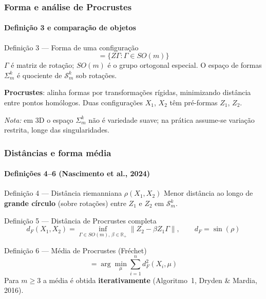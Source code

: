 \documentclass[brazilian,11pt]{beamer}
\begin{document}
\begin{frame}[shrink=8]
    \frametitle{Forma e análise de Procrustes}
    \framesubtitle{Definição 3 e comparação de objetos}

    \begin{block}{Definição 3 --- Forma de uma configuração}
        \begin{equation}
            [Z] = \{ Z\Gamma : \Gamma \in SO(m) \}
        \end{equation}
        $\Gamma$ é matriz de rotação; $SO(m)$ é o grupo ortogonal especial. O espaço de formas $\Sigma_m^k$ é quociente de $\mathcal{S}_m^k$ sob rotações.
    \end{block}

    \textbf{Procrustes}: alinha formas por transformações rígidas, minimizando distância entre pontos homólogos. Duas configurações $X_1$, $X_2$ têm pré-formas $Z_1$, $Z_2$.

    \vspace{0.2em}
    \footnotesize\textit{Nota:} em 3D o espaço $\Sigma_m^k$ não é variedade suave; na prática assume-se variação restrita, longe das singularidades.
\end{frame}

\begin{frame}[shrink=12]
    \frametitle{Distâncias e forma média}
    \framesubtitle{Definições 4--6 (Nascimento et al., 2024)}

    \small
    \begin{block}{Definição 4 --- Distância riemanniana $\rho(X_1,X_2)$}
        Menor distância ao longo de \textbf{grande círculo} (sobre rotações) entre $Z_1$ e $Z_2$ em $\mathcal{S}_m^k$.
    \end{block}

    \begin{block}{Definição 5 --- Distância de Procrustes completa}
        \begin{equation}
            d_F(X_1, X_2) = \inf_{\Gamma \in SO(m),\, \beta \in \mathbb{R}_+} \left\| Z_2 - \beta Z_1 \Gamma \right\|, \qquad d_F = \sin(\rho)
        \end{equation}
    \end{block}

    \begin{block}{Definição 6 --- Média de Procrustes (Fréchet)}
        \begin{equation}
            [\hat{\mu}] = \arg\min_{\mu} \sum_{i=1}^{n} d_F^2(X_i, \mu)
        \end{equation}
        Para $m \geq 3$ a média é obtida \textbf{iterativamente} (Algoritmo~1, Dryden \& Mardia, 2016).
    \end{block}
\end{frame}
\end{document}
